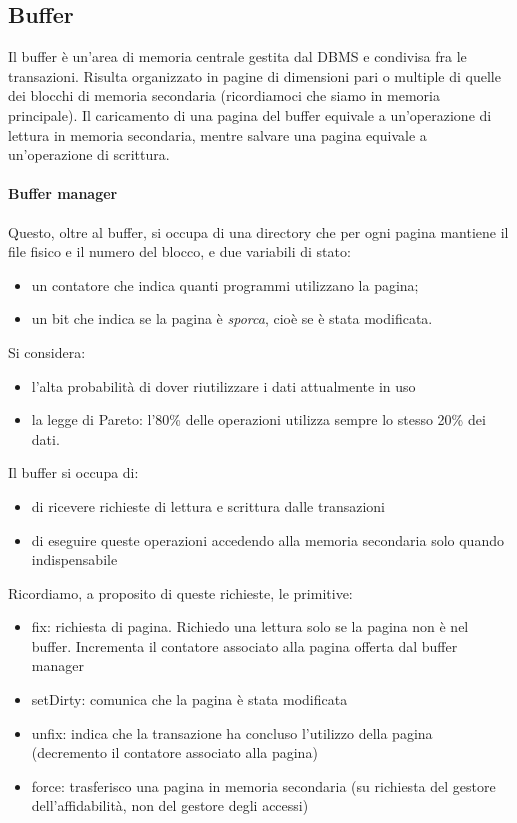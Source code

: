 \subsection{Buffer} Il buffer è un'area di memoria centrale gestita dal DBMS e condivisa fra le transazioni. Risulta organizzato in pagine di dimensioni pari o multiple di quelle dei blocchi di memoria secondaria (ricordiamoci che siamo in memoria principale). Il caricamento di una pagina del buffer equivale a un'operazione di lettura in memoria secondaria, mentre salvare una pagina equivale a un'operazione di scrittura.
\paragraph{Buffer manager} Questo, oltre al buffer, si occupa di una directory che per ogni pagina mantiene il file fisico e il numero del blocco, e due variabili di stato: 
\begin{itemize}
	\item un contatore che indica quanti programmi utilizzano la pagina; 
	\item un bit che indica se la pagina è \emph{sporca}, cioè se è stata modificata. 
\end{itemize}
Si considera:
\begin{itemize}
	\item l'alta probabilità di dover riutilizzare i dati attualmente in uso
	\item la legge di Pareto: l'80\% delle operazioni utilizza sempre lo stesso 20\% dei dati.
\end{itemize}
Il buffer si occupa di:
\begin{itemize}
	\item di ricevere richieste di lettura e scrittura dalle transazioni
	\item di eseguire queste operazioni accedendo alla memoria secondaria solo quando indispensabile
\end{itemize}
Ricordiamo, a proposito di queste richieste, le primitive:
\begin{itemize}
	\item fix: richiesta di pagina. Richiedo una lettura solo se la pagina non è nel buffer. Incrementa il contatore associato alla pagina offerta dal buffer manager
	\item setDirty: comunica che la pagina è stata modificata
	\item unfix: indica che la transazione ha concluso l'utilizzo della pagina (decremento il contatore associato alla pagina)
	\item force: trasferisco una pagina in memoria secondaria (su richiesta del gestore dell'affidabilità, non del gestore degli accessi)
\end{itemize}

